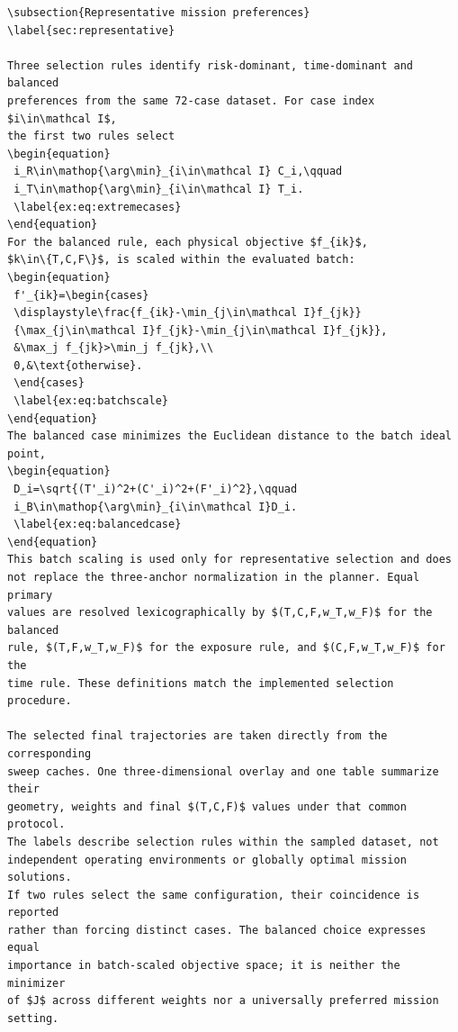 \documentclass[12pt]{article}
\begin{document}
\begin{verbatim}
\subsection{Representative mission preferences}
\label{sec:representative}

Three selection rules identify risk-dominant, time-dominant and balanced
preferences from the same 72-case dataset. For case index $i\in\mathcal I$,
the first two rules select
\begin{equation}
 i_R\in\mathop{\arg\min}_{i\in\mathcal I} C_i,\qquad
 i_T\in\mathop{\arg\min}_{i\in\mathcal I} T_i.
 \label{ex:eq:extremecases}
\end{equation}
For the balanced rule, each physical objective $f_{ik}$,
$k\in\{T,C,F\}$, is scaled within the evaluated batch:
\begin{equation}
 f'_{ik}=\begin{cases}
 \displaystyle\frac{f_{ik}-\min_{j\in\mathcal I}f_{jk}}
 {\max_{j\in\mathcal I}f_{jk}-\min_{j\in\mathcal I}f_{jk}},
 &\max_j f_{jk}>\min_j f_{jk},\\
 0,&\text{otherwise}.
 \end{cases}
 \label{ex:eq:batchscale}
\end{equation}
The balanced case minimizes the Euclidean distance to the batch ideal point,
\begin{equation}
 D_i=\sqrt{(T'_i)^2+(C'_i)^2+(F'_i)^2},\qquad
 i_B\in\mathop{\arg\min}_{i\in\mathcal I}D_i.
 \label{ex:eq:balancedcase}
\end{equation}
This batch scaling is used only for representative selection and does
not replace the three-anchor normalization in the planner. Equal primary
values are resolved lexicographically by $(T,C,F,w_T,w_F)$ for the balanced
rule, $(T,F,w_T,w_F)$ for the exposure rule, and $(C,F,w_T,w_F)$ for the
time rule. These definitions match the implemented selection procedure.

The selected final trajectories are taken directly from the corresponding
sweep caches. One three-dimensional overlay and one table summarize their
geometry, weights and final $(T,C,F)$ values under that common protocol.
The labels describe selection rules within the sampled dataset, not
independent operating environments or globally optimal mission solutions.
If two rules select the same configuration, their coincidence is reported
rather than forcing distinct cases. The balanced choice expresses equal
importance in batch-scaled objective space; it is neither the minimizer
of $J$ across different weights nor a universally preferred mission setting.


\end{verbatim}
\end{document}
